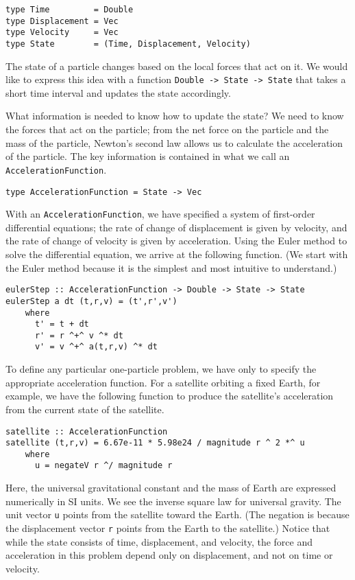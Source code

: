 \documentclass{eptcs}
\begin{document}
\begin{verbatim}
type Time         = Double
type Displacement = Vec
type Velocity     = Vec
type State        = (Time, Displacement, Velocity)
\end{verbatim}

The state of a particle changes based on the local forces that act on it.
We would like to express this idea with a function
\verb|Double -> State -> State| that takes a short time interval
and updates the state accordingly.

What information is needed to know how to update the state?
We need to know the forces that act on the particle; from the
net force on the particle and the mass of the particle, Newton's
second law allows us to calculate the acceleration of the particle.
The key information is contained in what we call an
\verb|AccelerationFunction|.

\begin{verbatim}
type AccelerationFunction = State -> Vec
\end{verbatim}

With an \verb|AccelerationFunction|, we have specified a
system of first-order differential equations; the rate of change
of displacement is given by velocity, and the rate of change of
velocity is given by acceleration.
Using the Euler method to solve the differential equation,
we arrive at the following function.  (We start with the Euler
method because it is the simplest and most intuitive to understand.)

\begin{verbatim}
eulerStep :: AccelerationFunction -> Double -> State -> State
eulerStep a dt (t,r,v) = (t',r',v')
    where
      t' = t + dt
      r' = r ^+^ v ^* dt
      v' = v ^+^ a(t,r,v) ^* dt
\end{verbatim}

To define any particular one-particle problem, we have only to specify the appropriate
acceleration function.
For a satellite orbiting a fixed Earth, for example, we have
the following function to produce the satellite's acceleration from
the current state of the satellite.
\begin{verbatim}
satellite :: AccelerationFunction
satellite (t,r,v) = 6.67e-11 * 5.98e24 / magnitude r ^ 2 *^ u
    where
      u = negateV r ^/ magnitude r
\end{verbatim}
Here, the universal gravitational constant and the mass of Earth
are expressed numerically in SI units.  We see the inverse square law
for universal gravity.  The unit vector \verb|u|
points from the satellite toward the Earth.
(The negation is because the displacement vector \verb|r| points
from the Earth to the satellite.)  Notice that while the state
consists of time, displacement, and velocity, the force and acceleration
in this problem depend only on displacement, and not on time or velocity.
\end{document}
